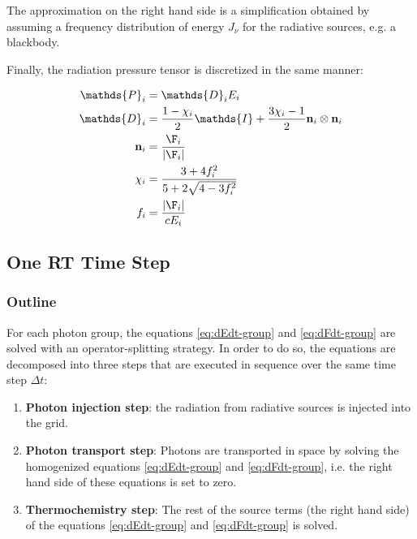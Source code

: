 The approximation on the right hand side is a simplification obtained by assuming
a frequency distribution of energy $J_{\nu}$ for the radiative sources, e.g. a blackbody.

Finally, the radiation pressure tensor is discretized in the same manner:

\begin{align}
	\mathds{P}_i &=
        \mathds{D}_i E_i \label{eq:pressure-tensor-group-start}\\
	\mathds{D}_i &=
        \frac{1- \chi_i}{2} \mathds{I} + \frac{3 \chi_i - 1}{2} \mathbf{n}_i \otimes \mathbf{n}_i \label{eq:eddington-group} \\
	\mathbf{n}_i &=
        \frac{\F_i}{|\F_i|} \\
	\chi_i &=
        \frac{3 + 4 f_i ^2}{5 + 2 \sqrt{4 - 3 f_i^2}} \\
	f_i &=
        \frac{|\F_i|}{c E_i} \label{eq:pressure-tensor-group-end}
\end{align}













\subsection{One RT Time Step}



\subsubsection{Outline}


For each photon group, the equations \ref{eq:dEdt-group} and \ref{eq:dFdt-group} are solved with an operator-splitting strategy.
In order to do so, the equations are decomposed into three steps that are executed in sequence over the same time step $\Delta t$:

\begin{enumerate}

\item \textbf{Photon injection step}: the radiation from radiative sources is injected into the grid.

\item \textbf{Photon transport step}: Photons are transported in space by solving the homogenized equations \ref{eq:dEdt-group} and \ref{eq:dFdt-group}, i.e. the right hand side of these equations is set to zero.

\item \textbf{Thermochemistry step}: The rest of the source terms (the right hand side) of the equations \ref{eq:dEdt-group} and \ref{eq:dFdt-group} is solved.
\end{enumerate}






